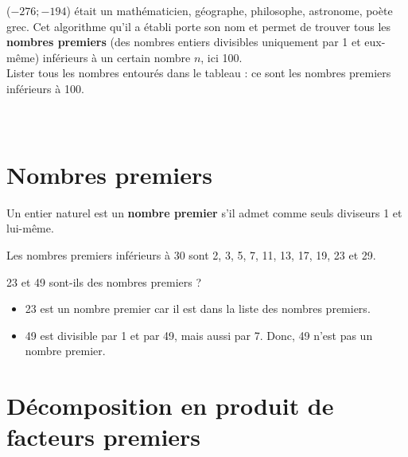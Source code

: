\begin{activite}
\begin{QCM}
    ($-276 ; -194$) était un mathématicien, géographe, philosophe, astronome, poète grec. Cet algorithme qu'il a établi porte son nom et permet de trouver tous les {\bf nombres premiers} (des nombres entiers divisibles uniquement par 1 et eux-même) inférieurs à un certain nombre $n$, ici 100. \\ [3mm]
      Lister tous les nombres entourés dans le tableau : ce sont les nombres premiers inférieurs à 100. \\ [3mm]
      \pf \\ [3mm]
      \pf \\ [3mm]
   \end{QCM}
 \end{activite}


\cours 

\section{Nombres premiers} %

\begin{definition}
   Un entier naturel est un \textbf{nombre premier} s'il admet comme seuls diviseurs 1 et lui-même.
\end{definition}

\medskip

\begin{propriete}
   Les nombres premiers inférieurs à 30 sont 2, 3, 5, 7, 11, 13, 17, 19, 23 et 29.
\end{propriete}

\begin{exemple}
   23 et 49 sont-ils des nombres premiers ?
   \correction
   \vspace*{-5mm}
   \begin{itemize}
      \item 23 est un nombre premier car il est dans la liste des nombres premiers.
      \item 49 est divisible par 1 et par 49, mais aussi par 7. Donc, 49 n'est pas un nombre premier.
   \end{itemize}
\end{exemple}


\section{Décomposition en produit de facteurs premiers} %

